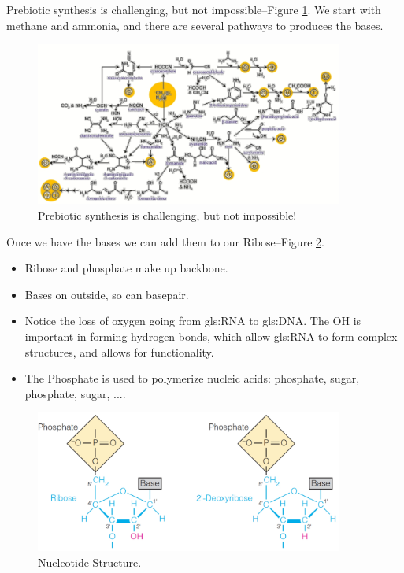 \documentclass[]{article}
\begin{document}
{Prebiotic synthesis is challenging, but not impossible--Figure \ref{fig:PrebioticSynthesis}. We start with methane and ammonia, and there are several pathways to produces the bases.
\begin{figure}[H]
	\caption{Prebiotic synthesis is challenging, but not impossible!}\label{fig:PrebioticSynthesis} 
	\includegraphics[width=0.9\textwidth]{PrebioticSynthesis}
\end{figure}
Once we have the bases we can add them to our Ribose--Figure \ref{fig:NucleotideStructure}.
\begin{itemize}
	\item Ribose and phosphate make up backbone.
	\item Bases on outside, so can basepair.
	\item Notice the loss of oxygen going from \gls{gls:RNA} to \gls{gls:DNA}. The OH is important in forming hydrogen bonds, which allow \gls{gls:RNA} to form complex structures, and allows for functionality. 
	\item The Phosphate is used to polymerize nucleic acids: phosphate, sugar,  phosphate, sugar, ....
\end{itemize}
\begin{figure}[H]
	\caption{Nucleotide Structure.  }\label{fig:NucleotideStructure} 
	\includegraphics[width=0.9\textwidth]{NucleotideStructure}
\end{figure}


}
\end{document}
